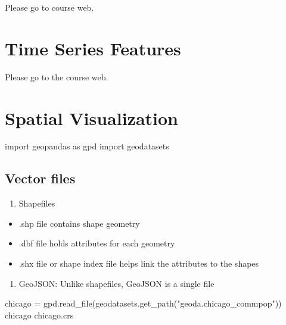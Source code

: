 \documentclass[
  letterpaper,
  DIV=11,
  numbers=noendperiod]{scrreprt}
\newenvironment{Shaded}{\begin{snugshade}}{\end{snugshade}}
\newcommand{\ImportTok}[1]{\textcolor[rgb]{0.00,0.46,0.62}{#1}}
\newcommand{\NormalTok}[1]{\textcolor[rgb]{0.00,0.23,0.31}{#1}}
\newcommand{\OperatorTok}[1]{\textcolor[rgb]{0.37,0.37,0.37}{#1}}
\newcommand{\StringTok}[1]{\textcolor[rgb]{0.13,0.47,0.30}{#1}}
\providecommand{\tightlist}{%
  \setlength{\itemsep}{0pt}\setlength{\parskip}{0pt}}\usepackage{longtable,booktabs,array}
\begin{document}
Please go to course web.


\hypertarget{time-series-features}{%
\chapter{Time Series Features}\label{time-series-features}}

Please go to the course web.


\hypertarget{spatial-visualization}{%
\chapter{Spatial Visualization}\label{spatial-visualization}}

\begin{Shaded}
\begin{Highlighting}[]
\ImportTok{import}\NormalTok{ geopandas }\ImportTok{as}\NormalTok{ gpd}
\ImportTok{import}\NormalTok{ geodatasets}
\end{Highlighting}
\end{Shaded}

\hypertarget{vector-files}{%
\section{Vector files}\label{vector-files}}

\begin{enumerate}
\def\labelenumi{\arabic{enumi}.}
\tightlist
\item
  Shapefiles
\end{enumerate}

\begin{itemize}
\item
  .shp file contains shape geometry
\item
  .dbf file holds attributes for each geometry
\item
  .shx file or shape index file helps link the attributes to the shapes
\end{itemize}

\begin{enumerate}
\def\labelenumi{\arabic{enumi}.}
\setcounter{enumi}{1}
\tightlist
\item
  GeoJSON: Unlike shapefiles, GeoJSON is a single file
\end{enumerate}

\begin{Shaded}
\begin{Highlighting}[]
\NormalTok{chicago }\OperatorTok{=}\NormalTok{ gpd.read\_file(geodatasets.get\_path(}\StringTok{"geoda.chicago\_commpop"}\NormalTok{))}
\NormalTok{chicago}
\NormalTok{chicago.crs}
\end{Highlighting}
\end{Shaded}
\end{document}
